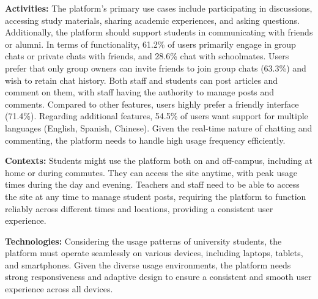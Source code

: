 \documentclass[12pt]{article}
\begin{document}
    \textbf{Activities:} The platform's primary use cases include participating in discussions, accessing study materials, sharing academic experiences, and asking questions. Additionally, the platform should support students in communicating with friends or alumni. In terms of functionality, 61.2\% of users primarily engage in group chats or private chats with friends, and 28.6\% chat with schoolmates. Users prefer that only group owners can invite friends to join group chats (63.3\%) and wish to retain chat history. Both staff and students can post articles and comment on them, with staff having the authority to manage posts and comments. Compared to other features, users highly prefer a friendly interface (71.4\%). Regarding additional features, 54.5\% of users want support for multiple languages (English, Spanish, Chinese). Given the real-time nature of chatting and commenting, the platform needs to handle high usage frequency efficiently.

    \textbf{Contexts:} Students might use the platform both on and off-campus, including at home or during commutes. They can access the site anytime, with peak usage times during the day and evening. Teachers and staff need to be able to access the site at any time to manage student posts, requiring the platform to function reliably across different times and locations, providing a consistent user experience.

    \textbf{Technologies:} Considering the usage patterns of university students, the platform must operate seamlessly on various devices, including laptops, tablets, and smartphones. Given the diverse usage environments, the platform needs strong responsiveness and adaptive design to ensure a consistent and smooth user experience across all devices.
\end{document}
